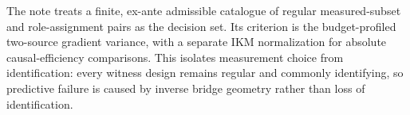 The note treats a finite, ex-ante admissible catalogue of regular measured-subset and role-assignment pairs as the decision set. Its criterion is the budget-profiled two-source gradient variance, with a separate IKM normalization for absolute causal-efficiency comparisons. This isolates measurement choice from identification: every witness design remains regular and commonly identifying, so predictive failure is caused by inverse bridge geometry rather than loss of identification.